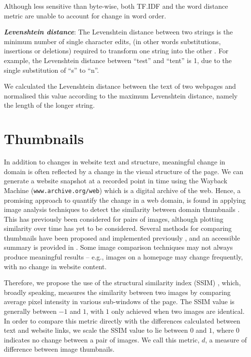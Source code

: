\documentclass[10pt, a4paper]{article}
\begin{document}
Although less sensitive than byte-wise, both TF.IDF and the word distance metric are unable to account for change in word order. 

\textit{\textbf{Levenshtein distance}}:
The Levenshtein distance between two strings is the minimum number of single character edits, (in other words substitutions, insertions or deletions) required to transform one string into the other \cite{levenshtein1996}. For example, the Levenshtein distance between ``test'' and ``tent'' is 1, due to the single substitution of ``s'' to ``n''.

We calculated the Levenshtein distance between the text of two webpages and normalised this value according to the maximum Levenshtein distance, namely the length of the longer string. 

\section{Thumbnails}

In addition to changes in website text and structure, meaningful change in domain is often reflected by a change in the visual structure of the page. We can generate a website snapshot at a recorded point in time using the Wayback Machine (\texttt{www.archive.org/web}) which is a digital archive of the web. Hence, a promising approach to quantify the change in a web domain, is found in applying image analysis techniques to detect the similarity between domain thumbnails \cite{alsum2014thumbnail}. This has previously been considered for pairs of images, although plotting similarity over time has yet to be considered. Several methods for comparing thumbnails have been proposed and implemented previously \cite{henzinger,broder,manku}, and an accessible summary is provided in \cite{alsum2014thumbnail}. Some image comparison techniques may not always produce meaningful results -- e.g., images on a homepage may change frequently, with no change in website content.

Therefore, we propose the use of the structural similarity index (SSIM) \cite{ssim}, which, broadly speaking, measures the similarity between two images by comparing average pixel intensity in various sub-windows of the page. The SSIM value is generally between $-1$ and $1$, with $1$ only achieved when two images are identical. In order to compare this metric directly with the differences calculated between text and website links, we scale the SSIM value to lie between $0$ and $1$, where $0$ indicates no change between a pair of images. We call this metric, $d$, a measure of difference between image thumbnails.
\end{document}
